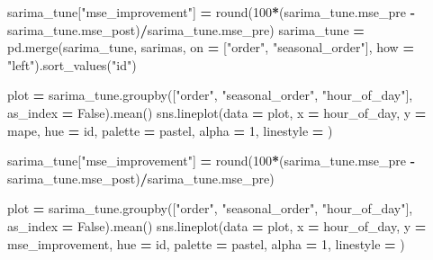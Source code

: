 \documentclass[mstat,12pt]{unswthesis}
\newenvironment{Shaded}{\begin{snugshade}}{\end{snugshade}}
\newcommand{\BuiltInTok}[1]{#1}
\newcommand{\DecValTok}[1]{\textcolor[rgb]{0.00,0.00,0.81}{#1}}
\newcommand{\NormalTok}[1]{#1}
\newcommand{\OperatorTok}[1]{\textcolor[rgb]{0.81,0.36,0.00}{\textbf{#1}}}
\newcommand{\StringTok}[1]{\textcolor[rgb]{0.31,0.60,0.02}{#1}}
\newcommand{\VariableTok}[1]{\textcolor[rgb]{0.00,0.00,0.00}{#1}}
\begin{document}
\begin{Shaded}
\begin{Highlighting}[]
\NormalTok{sarima\_tune[}\StringTok{"mse\_improvement"}\NormalTok{] }\OperatorTok{=} \BuiltInTok{round}\NormalTok{(}\DecValTok{100}\OperatorTok{*}\NormalTok{(sarima\_tune.mse\_pre }\OperatorTok{{-}} 
\NormalTok{    sarima\_tune.mse\_post)}\OperatorTok{/}\NormalTok{sarima\_tune.mse\_pre)}
\NormalTok{sarima\_tune }\OperatorTok{=}\NormalTok{ pd.merge(sarima\_tune, sarimas, on }\OperatorTok{=} 
\NormalTok{    [}\StringTok{"order"}\NormalTok{, }\StringTok{"seasonal\_order"}\NormalTok{], how }\OperatorTok{=} \StringTok{"left"}\NormalTok{).sort\_values(}\StringTok{"id"}\NormalTok{)}

\NormalTok{plot }\OperatorTok{=}\NormalTok{ sarima\_tune.groupby([}\StringTok{"order"}\NormalTok{, }\StringTok{"seasonal\_order"}\NormalTok{, }\StringTok{"hour\_of\_day"}\NormalTok{], }
\NormalTok{    as\_index }\OperatorTok{=} \VariableTok{False}\NormalTok{).mean()}
\NormalTok{sns.lineplot(data }\OperatorTok{=}\NormalTok{ plot, x }\OperatorTok{=} \StringTok{\textquotesingle{}hour\_of\_day\textquotesingle{}}\NormalTok{, y }\OperatorTok{=} \StringTok{\textquotesingle{}mape\textquotesingle{}}\NormalTok{, hue }\OperatorTok{=} \StringTok{\textquotesingle{}id\textquotesingle{}}\NormalTok{, }
\NormalTok{    palette }\OperatorTok{=} \StringTok{\textquotesingle{}pastel\textquotesingle{}}\NormalTok{, alpha }\OperatorTok{=} \DecValTok{1}\NormalTok{, linestyle }\OperatorTok{=} \StringTok{\textquotesingle{}{-}{-}\textquotesingle{}}\NormalTok{)}
\end{Highlighting}
\end{Shaded}

\begin{Shaded}
\begin{Highlighting}[]
\NormalTok{sarima\_tune[}\StringTok{"mse\_improvement"}\NormalTok{] }\OperatorTok{=} \BuiltInTok{round}\NormalTok{(}\DecValTok{100}\OperatorTok{*}\NormalTok{(sarima\_tune.mse\_pre }\OperatorTok{{-}} 
\NormalTok{    sarima\_tune.mse\_post)}\OperatorTok{/}\NormalTok{sarima\_tune.mse\_pre)}

\NormalTok{plot }\OperatorTok{=}\NormalTok{ sarima\_tune.groupby([}\StringTok{"order"}\NormalTok{, }\StringTok{"seasonal\_order"}\NormalTok{, }\StringTok{"hour\_of\_day"}\NormalTok{], }
\NormalTok{    as\_index }\OperatorTok{=} \VariableTok{False}\NormalTok{).mean()}
\NormalTok{sns.lineplot(data }\OperatorTok{=}\NormalTok{ plot, x }\OperatorTok{=} \StringTok{\textquotesingle{}hour\_of\_day\textquotesingle{}}\NormalTok{, y }\OperatorTok{=} \StringTok{\textquotesingle{}mse\_improvement\textquotesingle{}}\NormalTok{, }
\NormalTok{    hue }\OperatorTok{=} \StringTok{\textquotesingle{}id\textquotesingle{}}\NormalTok{, palette }\OperatorTok{=} \StringTok{\textquotesingle{}pastel\textquotesingle{}}\NormalTok{, alpha }\OperatorTok{=} \DecValTok{1}\NormalTok{, linestyle }\OperatorTok{=} \StringTok{\textquotesingle{}{-}{-}\textquotesingle{}}\NormalTok{)}
\end{Highlighting}
\end{Shaded}
\end{document}
